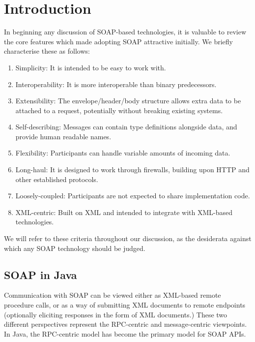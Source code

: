 \section{Introduction}
\label{introduction}

In
beginning any discussion of SOAP-based technologies, it is 
valuable to review the core features which made adopting SOAP
attractive initially. We briefly characterise these as follows:

\begin{enumerate}
\item Simplicity: It is intended to be easy to work with.

\item Interoperability: It is more interoperable than binary
predecessors.

\item Extensibility: The envelope/header/body structure
allows extra data to be attached to a request, potentially without
breaking existing systems.

\item Self-describing: Messages can contain type definitions
alongside data, and provide human readable names.

\item Flexibility: Participants can handle variable amounts
of incoming data.

\item Long-haul: It is designed to work through firewalls,
building upon HTTP and other established protocols.

\item Loosely-coupled: Participants are not expected to share
implementation code.

\item XML-centric: Built on XML and intended to integrate with
XML-based technologies.

\end{enumerate}

We will refer to these criteria throughout our discussion, as the
desiderata against which any SOAP technology should be judged.

\subsection{SOAP in Java}
\label{intro:java}

Communication with SOAP can be viewed either as XML-based remote
procedure calls, or as a way of submitting XML documents to remote
endpoints (optionally eliciting responses in the form of XML
documents.) These two different perspectives represent the RPC-centric
and message-centric viewpoints. In Java, the RPC-centric model has
become the primary model for SOAP APIs.

